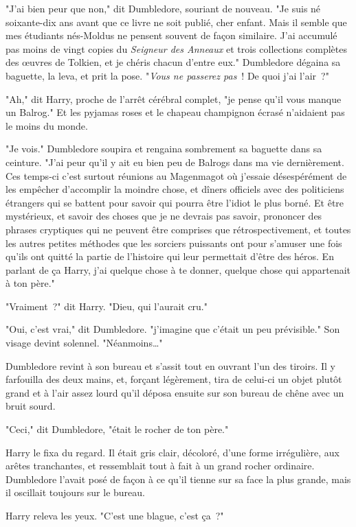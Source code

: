 "J'ai bien peur que non," dit Dumbledore, souriant de nouveau. "Je suis né soixante-dix ans avant que ce livre ne soit publié, cher enfant. Mais il semble que mes étudiants nés-Moldus ne pensent souvent de façon similaire. J'ai accumulé pas moins de vingt copies du \emph{Seigneur des Anneaux} et trois collections complètes des œuvres de Tolkien, et je chéris chacun d'entre eux." Dumbledore dégaina sa baguette, la leva, et prit la pose. "\emph{Vous ne passerez pas}~! De quoi j'ai l'air~?"

"Ah," dit Harry, proche de l'arrêt cérébral complet, "je pense qu'il vous manque un Balrog." Et les pyjamas roses et le chapeau champignon écrasé n'aidaient pas le moins du monde.

"Je vois." Dumbledore soupira et rengaina sombrement sa baguette dans sa ceinture. "J'ai peur qu'il y ait eu bien peu de Balrogs dans ma vie dernièrement. Ces temps-ci c'est surtout réunions au Magenmagot où j'essaie désespérément de les empêcher d'accomplir la moindre chose, et dîners officiels avec des politiciens étrangers qui se battent pour savoir qui pourra être l'idiot le plus borné. Et être mystérieux, et savoir des choses que je ne devrais pas savoir, prononcer des phrases cryptiques qui ne peuvent être comprises que rétrospectivement, et toutes les autres petites méthodes que les sorciers puissants ont pour s'amuser une fois qu'ils ont quitté la partie de l'histoire qui leur permettait d'être des héros. En parlant de ça Harry, j'ai quelque chose à te donner, quelque chose qui appartenait à ton père."

"Vraiment~?" dit Harry. "Dieu, qui l'aurait cru."

"Oui, c'est vrai," dit Dumbledore. "j'imagine que c'était un peu prévisible." Son visage devint solennel. "Néanmoins…"

Dumbledore revint à son bureau et s'assit tout en ouvrant l'un des tiroirs. Il y farfouilla des deux mains, et, forçant légèrement, tira de celui-ci un objet plutôt grand et à l'air assez lourd qu'il déposa ensuite sur son bureau de chêne avec un bruit sourd.

"Ceci," dit Dumbledore, "était le rocher de ton père."

Harry le fixa du regard. Il était gris clair, décoloré, d'une forme irrégulière, aux arêtes tranchantes, et ressemblait tout à fait à un grand rocher ordinaire. Dumbledore l'avait posé de façon à ce qu'il tienne sur sa face la plus grande, mais il oscillait toujours sur le bureau.

Harry releva les yeux. "C'est une blague, c'est ça~?"

